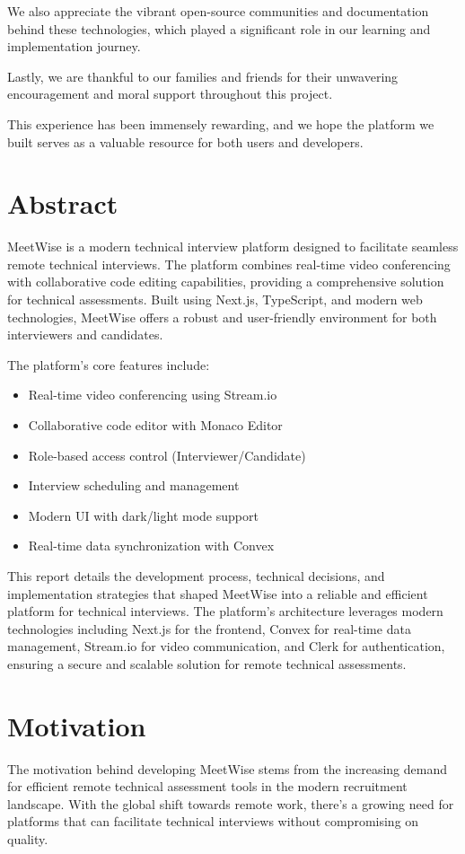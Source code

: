 \documentclass[12pt,a4paper]{report}
\begin{document}
We also appreciate the vibrant open-source communities and documentation behind these technologies, which played a significant role in our learning and implementation journey.

Lastly, we are thankful to our families and friends for their unwavering encouragement and moral support throughout this project.

This experience has been immensely rewarding, and we hope the platform we built serves as a valuable resource for both users and developers.
\clearpage

\chapter*{Abstract}
MeetWise is a modern technical interview platform designed to facilitate seamless remote technical interviews. The platform combines real-time video conferencing with collaborative code editing capabilities, providing a comprehensive solution for technical assessments. Built using Next.js, TypeScript, and modern web technologies, MeetWise offers a robust and user-friendly environment for both interviewers and candidates.

The platform's core features include:
\begin{itemize}
    \item Real-time video conferencing using Stream.io
    \item Collaborative code editor with Monaco Editor
    \item Role-based access control (Interviewer/Candidate)
    \item Interview scheduling and management
    \item Modern UI with dark/light mode support
    \item Real-time data synchronization with Convex
\end{itemize}

This report details the development process, technical decisions, and implementation strategies that shaped MeetWise into a reliable and efficient platform for technical interviews. The platform's architecture leverages modern technologies including Next.js for the frontend, Convex for real-time data management, Stream.io for video communication, and Clerk for authentication, ensuring a secure and scalable solution for remote technical assessments.
\clearpage

\chapter{Motivation}
The motivation behind developing MeetWise stems from the increasing demand for efficient remote technical assessment tools in the modern recruitment landscape. With the global shift towards remote work, there's a growing need for platforms that can facilitate technical interviews without compromising on quality.
\end{document}

